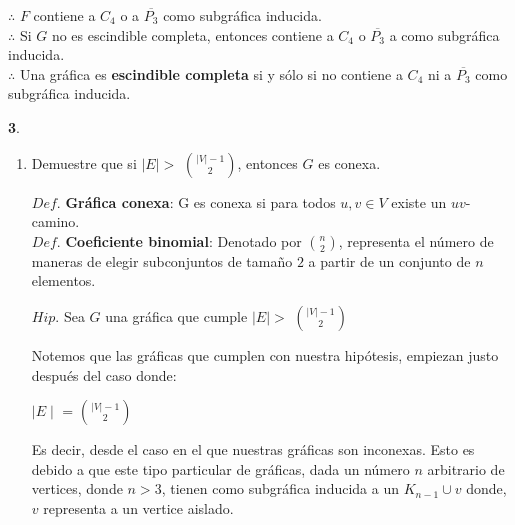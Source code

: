 \documentclass[12pt]{article}
\begin{document}
	$\therefore$ $F$ contiene a $C_4$ o a $\overline{P_3}$ como subgráfica inducida.\\

	$\therefore$ Si $G$ no es escindible completa, entonces contiene a $C_4$ o $\overline{P_3}$ a  como subgráfica inducida.\\
	
	$\therefore$ Una gráfica es \textbf{escindible completa} si y sólo si no contiene a $C_4$ ni a $\overline{P_3}$ como subgráfica inducida.\\
\vspace{1cm}

%
%
\textbf{3}.

\begin{enumerate}[label=\alph*)]

    \item Demuestre que si $\mid E \mid >$ \( \binom{|V|-1}{2} \), entonces $G$ es conexa.
    \begin{tcolorbox}[title=\textbf{Definiciones}, colback=blue!15!white, colframe=black!]
        $Def.$ \textbf{Gráfica conexa}: G es conexa si para todos $u, v \in V$  existe un $uv$-camino.\\

        $Def.$ \textbf{Coeficiente binomial}: Denotado por \( \binom{n}{2} \), representa el número de maneras 
        de elegir subconjuntos de tamaño $2$ a partir de un conjunto de $n$ elementos.
    
    \end{tcolorbox}
    \begin{tcolorbox}[title=\textbf{Hipotesis}, colback=red!15!white, colframe=black!]
        $Hip.$ Sea $G$ una gráfica que cumple $\mid E \mid >$ \( \binom{|V|-1}{2} \)

    \end{tcolorbox}

    Notemos que las gráficas que cumplen con nuestra hipótesis, empiezan justo después del caso donde:

    \begin{center}
        $\mid E \mid$ = \( \binom{|V|-1}{2} \)
    \end{center}

    Es decir, desde el caso en el que nuestras gráficas son inconexas. Esto es debido a que este tipo particular de 
    gráficas, dada un número $n$ arbitrario de vertices, donde $n > 3$, tienen como subgráfica inducida a un $K_{n-1} \cup v$ 
    donde, $v$ representa a un vertice aislado.\\


\end{enumerate}
\end{document}
